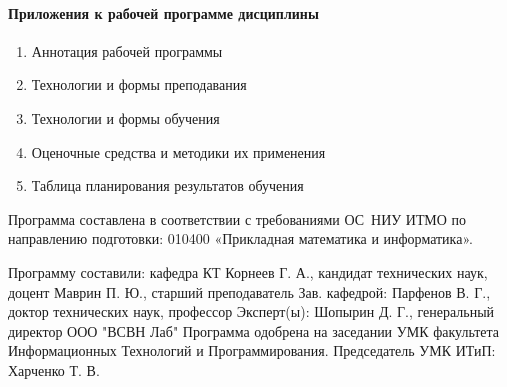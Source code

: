 \begin{center}
\paragraph{Приложения к рабочей программе дисциплины}
{
\begin{enumerate}
\item Аннотация рабочей программы
\item Технологии и формы преподавания 
\item Технологии и формы обучения 
\item Оценочные средства и методики их применения
\item Таблица планирования результатов обучения
\end{enumerate}
}

Программа составлена в соответствии с требованиями ОС НИУ ИТМО по направлению подготовки: 010400 «Прикладная математика и информатика».

{\parindent0pt
Программу составили:
кафедра КТ  Корнеев Г. А., кандидат технических наук, доцент  Маврин П. Ю., старший преподаватель
Зав. кафедрой:
 Парфенов В. Г., доктор технических наук, профессор
Эксперт(ы):  Шопырин Д. Г., генеральный директор ООО "ВСВН Лаб"
Программа одобрена на заседании УМК факультета Информационных Технологий и Программирования.
Председатель УМК ИТиП:
 Харченко Т. В.
}


\end{center}
